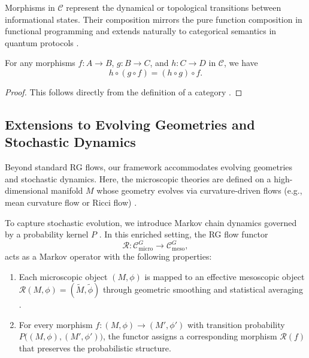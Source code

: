 	\begin{remark}
		Morphisms in \(\mathcal{C}\) represent the dynamical or topological transitions between informational states. Their composition mirrors the pure function composition in functional programming \cite{hudak1989conception} and extends naturally to categorical semantics in quantum protocols \cite{abramsky2004categorical, selinger2007dagger}.
	\end{remark}
	
	\begin{theorem}
		For any morphisms \(f: A \to B\), \(g: B \to C\), and \(h: C \to D\) in \(\mathcal{C}\), we have
		\[
		h\circ (g\circ f) = (h\circ g)\circ f.
		\]
	\end{theorem}
	
	\begin{proof}
		This follows directly from the definition of a category \cite{maclane1971categories}.
	\end{proof}
	
	\subsection{Extensions to Evolving Geometries and Stochastic Dynamics}
	
	Beyond standard RG flows, our framework accommodates evolving geometries and stochastic dynamics. Here, the microscopic theories are defined on a high-dimensional manifold \(M\) whose geometry evolves via curvature-driven flows (e.g., mean curvature flow or Ricci flow) \cite{hamilton1982three, grayson1987shortening}. 
	
	To capture stochastic evolution, we introduce Markov chain dynamics governed by a probability kernel \(P\) \cite{levin2009markov}. In this enriched setting, the RG flow functor
	\[
	\mathcal{R}: \mathcal{C}_{\text{micro}}^G \to \mathcal{C}_{\text{meso}}^G,
	\]
	acts as a Markov operator with the following properties:
	\begin{enumerate}[label=(\alph*)]
		\item Each microscopic object \((M, \phi)\) is mapped to an effective mesoscopic object \(\mathcal{R}(M, \phi) = (\widetilde{M}, \widetilde{\phi})\) through geometric smoothing and statistical averaging \cite{e2003multiscale}.
		\item For every morphism \(f: (M, \phi) \to (M', \phi')\) with transition probability \(P\big((M, \phi), (M', \phi')\big)\), the functor assigns a corresponding morphism \(\mathcal{R}(f)\) that preserves the probabilistic structure.
	\end{enumerate}
	
